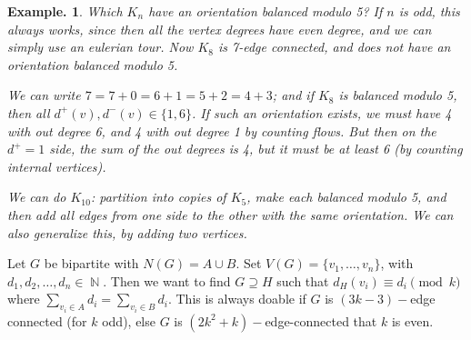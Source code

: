 \documentclass[11pt, a4paper]{memoir}
\DeclareMathOperator{\N}{{\mathbb{N}}}
\theoremstyle{change}
\theoremstyle{plain}
\theoremstyle{nonumberplain}
\newtheorem{example}{Example.}
\numberwithin{equation}{section}
\begin{document}
\begin{example}
    Which $K_n$ have an orientation balanced modulo 5?
    If $n$ is odd, this always works, since then all the vertex degrees have even degree, and we can simply use an eulerian tour.
    Now $K_8$ is 7-edge connected, and does not have an orientation balanced modulo 5.

    We can write $7=7+0=6+1=5+2=4+3$; and if $K_8$ is balanced modulo 5, then all $d^+(v),d^-(v)\in\{1,6\}$.
    If such an orientation exists, we must have 4 with out degree 6, and 4 with out degree 1 by counting flows.
    But then on the $d^+=1$ side, the sum of the out degrees is 4, but it must be at least 6 (by counting internal vertices).

    We can do $K_{10}$: partition into copies of $K_5$, make each balanced modulo 5, and then add all edges from one side to the other with the same orientation.
    We can also generalize this, by adding two vertices.
\end{example}
Let $G$ be bipartite with $N(G)=A\cup B$.
Set $V(G)=\{v_1,\ldots,v_n\}$, with $d_1,d_2,\ldots,d_n\in\N$.
Then we want to find $G\supseteq H$ such that $d_H(v_i)\equiv d_i\pmod{k}$ where $\sum_{v_i\in A}d_i=\sum_{v_i\in B}d_i$.
This is always doable if $G$ is $(3k-3)-$edge connected (for $k$ odd), else $G$ is $(2k^2+k)-$edge-connected that $k$ is even.
\end{document}
